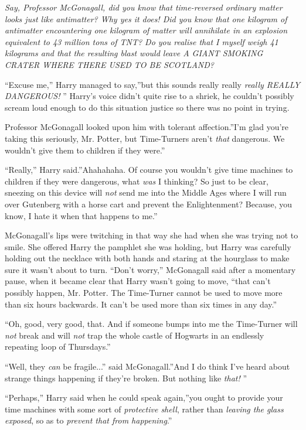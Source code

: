 \emph{Say, Professor McGonagall, did you know that time-reversed
ordinary matter looks just like antimatter? Why yes it does! Did you
know that one kilogram of antimatter encountering one kilogram of matter
will annihilate in an explosion equivalent to 43 million tons of TNT? Do
you realise that I myself weigh 41 kilograms and that the resulting
blast would leave A GIANT SMOKING CRATER WHERE THERE USED TO BE
SCOTLAND?}

``Excuse me,'' Harry managed to say,''but this sounds really really
\emph{really REALLY DANGEROUS!} '' Harry's voice didn't quite rise to a
shriek, he couldn't possibly scream loud enough to do this situation
justice so there was no point in trying.

Professor McGonagall looked upon him with tolerant affection.''I'm glad
you're taking this seriously, Mr. Potter, but Time-Turners aren't
\emph{that} dangerous. We wouldn't give them to children if they were.''

``Really,'' Harry said.''Ahahahaha. Of course you wouldn't give time
machines to children if they were dangerous, what \emph{was} I thinking?
So just to be clear, sneezing on this device will \emph{not} send me
into the Middle Ages where I will run over Gutenberg with a horse cart
and prevent the Enlightenment? Because, you know, I hate it when that
happens to me.''

McGonagall's lips were twitching in that way she had when she was trying
not to smile. She offered Harry the pamphlet she was holding, but Harry
was carefully holding out the necklace with both hands and staring at
the hourglass to make sure it wasn't about to turn. ``Don't worry,''
McGonagall said after a momentary pause, when it became clear that Harry
wasn't going to move, ``that can't possibly happen, Mr. Potter. The
Time-Turner cannot be used to move more than six hours backwards. It
can't be used more than six times in any day.''

``Oh, good, very good, that. And if someone bumps into me the Time-Turner
will \emph{not} break and will \emph{not} trap the whole castle of
Hogwarts in an endlessly repeating loop of Thursdays.''

``Well, they \emph{can} be fragile...'' said McGonagall.''And I do
think I've heard about strange things happening if they're broken. But
nothing like \emph{that!} ''

``Perhaps,'' Harry said when he could speak again,''you ought to provide
your time machines with some sort of \emph{protective shell}, rather
than \emph{leaving the glass exposed}, so as to \emph{prevent that from
happening}.''

